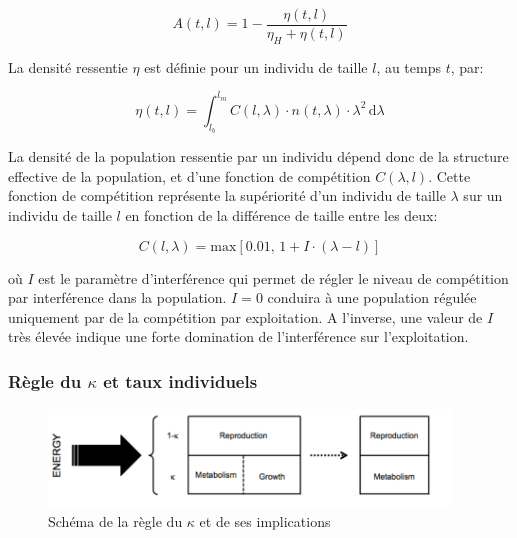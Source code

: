 \begin{equation}
\label{eq_an1}
A(t,l)=1-\frac{\eta(t,l)}{\eta_H+\eta(t,l) }  
\end{equation}

La densité ressentie $\eta$ est définie pour un individu de taille $l$, au temps
$t$, par:

\begin{equation}
\label{eq_an2}
\eta(t,l)=\int_{l_b}^{l_m} \! C(l,\lambda)\cdot n(t,\lambda)\cdot\lambda^2\, \mathrm{d}\lambda
\end{equation}

La densité de la population ressentie par un individu dépend donc de la
structure effective de la population, et d'une fonction de compétition $C(\lambda ,l)$.
Cette fonction de compétition représente la supériorité d'un individu de taille
$\lambda$ sur un individu de taille $l$ en fonction de la différence de taille
entre les deux:

\begin{equation}
\label{eq_an3}
C(l,\lambda) = \mathrm{max}\left[ 0.01,\, 1+I\cdot(\lambda-l) \right]
\end{equation}

où $I$ est le paramètre d'interférence qui permet de régler le niveau de
compétition par interférence dans la population. $I=0$ conduira à une population
régulée uniquement par de la compétition par exploitation. A l'inverse, une
valeur de $I$ très élevée indique une forte domination de l'interférence sur
l'exploitation.

\subsubsection{Règle du $\kappa$ et taux individuels}

\begin{figure}[!ht]
\begin{center}
\includegraphics[width=0.95\textwidth]{1_CorpsDeThese/Resumes/Fig/AN01}
\caption[Règle du
$\kappa$]{Schéma de la règle du $\kappa$ et de ses implications}
\label{fig:AN1}
\end{center}
\end{figure}

